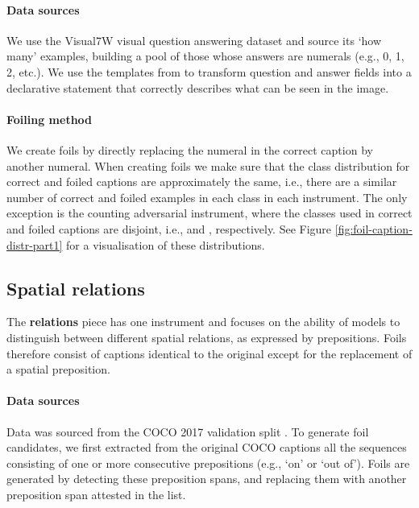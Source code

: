 \documentclass[11pt]{article}
\begin{document}
\paragraph{Data sources}
We use the Visual7W visual question answering dataset \citep{zhu2016cvpr} and source its `how many' examples, building a pool of those whose answers are numerals (e.g., 0, 1, 2, etc.).
We use the templates from \citet{parcalabescu2021seeing} to transform question and answer fields into a declarative statement that correctly describes what can be seen in the image.




\paragraph{Foiling method}
We create foils by directly replacing the numeral in the correct caption by another numeral. When creating foils we make sure that the class distribution for correct and foiled captions are approximately the same, i.e., there are a similar number of correct and foiled examples in each class in each instrument.
The only exception is the counting adversarial instrument, where the classes used in correct and foiled captions are disjoint, i.e.,  and , respectively.
See Figure \ref{fig:foil-caption-distr-part1} for a visualisation of these distributions.



\subsection{Spatial relations}\label{app:relations}
The \textbf{relations} piece has one instrument and focuses on the ability of models to distinguish between different spatial relations, as expressed by prepositions. Foils therefore consist of captions identical to the original except for the replacement of a spatial preposition.

\paragraph{Data sources} Data
was sourced from the COCO 2017 validation split \cite{Chen2015}. To generate foil candidates, we first extracted from the original COCO captions all the sequences consisting of one or more consecutive prepositions (e.g., `on' or `out of'). Foils are generated by detecting these preposition spans, and replacing them with another preposition span attested in the list.
\end{document}

